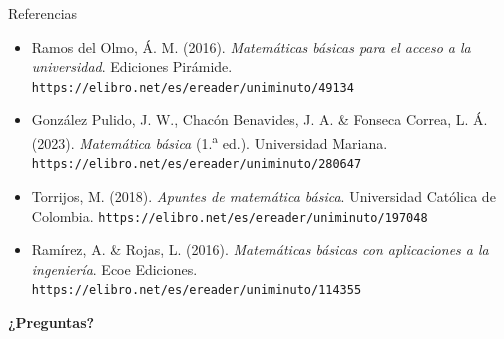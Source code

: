 \documentclass[aspectratio=169,10pt]{beamer}
\begin{document}
	\begin{frame}{Referencias}
		\footnotesize
		\begin{itemize}
			\item[{[1]}] Ramos del Olmo, Á. M. (2016). \textit{Matemáticas básicas
				para el acceso a la universidad}. Ediciones Pirámide.
			\texttt{https://elibro.net/es/ereader/uniminuto/49134}
			\item[{[2]}] González Pulido, J. W., Chacón Benavides, J. A. \&
			Fonseca Correa, L. Á. (2023). \textit{Matemática básica}
			(1.\textsuperscript{a} ed.). Universidad Mariana.
			\texttt{https://elibro.net/es/ereader/uniminuto/280647}
			\item[{[3]}] Torrijos, M. (2018). \textit{Apuntes de matemática básica}.
			Universidad Católica de Colombia.
			\texttt{https://elibro.net/es/ereader/uniminuto/197048}
			\item[{[4]}] Ramírez, A. \& Rojas, L. (2016). \textit{Matemáticas básicas
				con aplicaciones a la ingeniería}. Ecoe Ediciones.
			\texttt{https://elibro.net/es/ereader/uniminuto/114355}
		\end{itemize}
		
		\vspace{0.3cm}
		\begin{center}
			{\Large\color{uniAzul}\textbf{¿Preguntas?}}
		\end{center}
	\end{frame}
	
\end{document}
